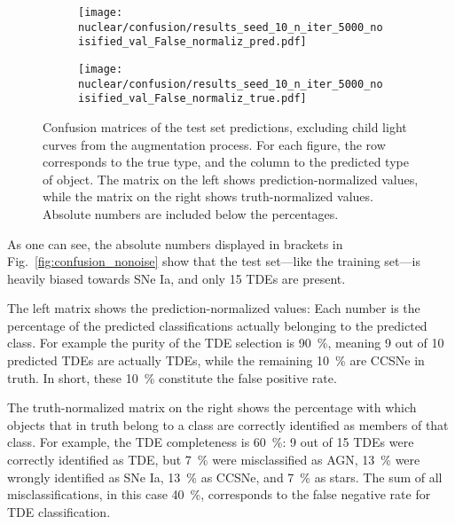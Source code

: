 \begin{figure}[htb]
  \centering
  \begin{subfigure}[b]{0.49\textwidth}
    \centering
    \texttt{[image: nuclear/confusion/results\_seed\_10\_n\_iter\_5000\_noisified\_val\_False\_normaliz\_pred.pdf]}
  \end{subfigure}
  \begin{subfigure}[b]{0.49\textwidth}
    \centering
    \texttt{[image: nuclear/confusion/results\_seed\_10\_n\_iter\_5000\_noisified\_val\_False\_normaliz\_true.pdf]}
  \end{subfigure}
  \caption[Confusion matrices without augmentation]{Confusion matrices of the test set predictions, excluding child light curves from the augmentation process. For each figure, the row corresponds to the true type, and the column to the predicted type of object. The matrix on the left shows prediction-normalized values, while the matrix on the right shows truth-normalized values. Absolute numbers are included below the percentages.}
\end{figure}

As one can see, the absolute numbers displayed in brackets in Fig.~\ref{fig:confusion_nonoise} show that the test set---like the training set---is heavily biased towards SNe Ia, and only 15 TDEs are present.

The left matrix shows the prediction-normalized values: Each number is the percentage of the predicted classifications actually belonging to the predicted class. For example the purity of the TDE selection is \SI{90}{\percent}, meaning 9 out of 10 predicted TDEs are actually TDEs, while the remaining \SI{10}{\percent} are CCSNe in truth. In short, these \SI{10}{\percent} constitute the false positive rate.

The truth-normalized matrix on the right shows the percentage with which objects that in truth belong to a class are correctly identified as members of that class. For example, the TDE completeness is \SI{60}{\percent}: 9 out of 15 TDEs were correctly identified as TDE, but \SI{7}{\percent} were misclassified as AGN, \SI{13}{\percent} were wrongly identified as SNe Ia, \SI{13}{\percent} as CCSNe, and \SI{7}{\percent} as stars. The sum of all misclassifications, in this case \SI{40}{\percent}, corresponds to the false negative rate for TDE classification.

